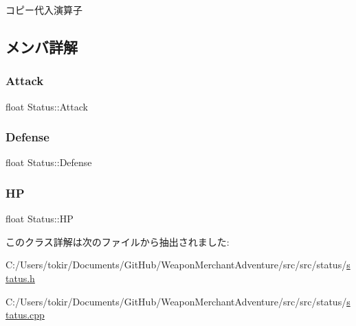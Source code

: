 コピー代入演算子 



\subsection{メンバ詳解}
\mbox{\label{class_status_aede601b020ef15845b86d631a46f8980}} 
\subsubsection{\texorpdfstring{Attack}{Attack}}
{\footnotesize\ttfamily float Status\+::\+Attack}

\mbox{\label{class_status_aee944c63904ca1b6b3b04e24b2a9ac12}} 
\subsubsection{\texorpdfstring{Defense}{Defense}}
{\footnotesize\ttfamily float Status\+::\+Defense}

\mbox{\label{class_status_a0ec54fdb31c6c4b1a23b22742e6babb4}} 
\subsubsection{\texorpdfstring{HP}{HP}}
{\footnotesize\ttfamily float Status\+::\+HP}



このクラス詳解は次のファイルから抽出されました\+:\begin{DoxyCompactItemize}
\item 
C\+:/\+Users/tokir/\+Documents/\+Git\+Hub/\+Weapon\+Merchant\+Adventure/src/src/status/\mbox{\hyperlink{status_8h}{status.\+h}}\item 
C\+:/\+Users/tokir/\+Documents/\+Git\+Hub/\+Weapon\+Merchant\+Adventure/src/src/status/\mbox{\hyperlink{status_8cpp}{status.\+cpp}}\end{DoxyCompactItemize}
